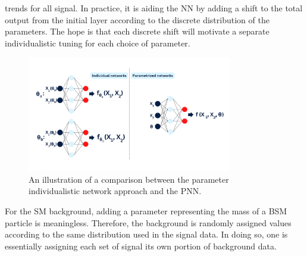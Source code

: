 trends for all signal. In practice, it is aiding the \ac{NN} by adding a shift to the total output from the initial layer according to 
the discrete distribution of the parameters. The hope is that each discrete shift will motivate a separate individualistic tuning
for each choice of parameter. 
\begin{figure}
    \centering
    \includegraphics[width=0.8\textwidth]{Figures/Illustrations/PNN.png}
    \vspace{-.8cm}
    \caption{An illustration of a comparison between the parameter individualistic network 
    approach and the \ac{PNN}.}
    \label{fig:PNN}
\end{figure}
For the \ac{SM} background, adding a parameter representing the mass of a \ac{BSM} particle is meaningless. 
Therefore, the background is randomly assigned values according to the same distribution used in the signal data. 
In doing so, one is essentially assigning each set of signal its own portion of background data. 